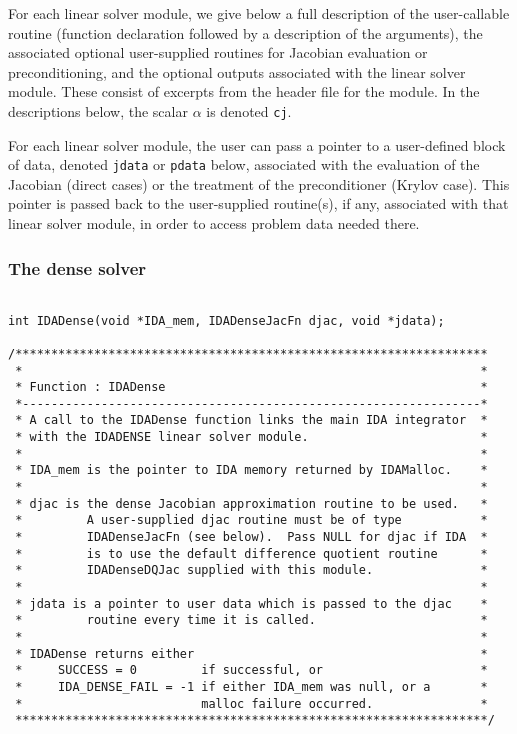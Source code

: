 For each linear solver module, we give below a full description of the
user-callable routine (function declaration followed by a description
of the arguments), the associated optional user-supplied routines for
Jacobian evaluation or preconditioning, and the optional outputs
associated with the linear solver module.  These consist of excerpts
from the header file for the module.  In the descriptions below, the
scalar $\alpha$ is denoted {\tt cj}.

For each linear solver module, the user can pass a pointer to a
user-defined block of data, denoted {\tt jdata} or {\tt pdata} below,
associated with the evaluation of the Jacobian (direct cases) or the
treatment of the preconditioner (Krylov case).  This pointer is passed
back to the user-supplied routine(s), if any, associated with that
linear solver module, in order to access problem data needed there.


\subsubsection{The dense solver}

\small
\begin{verbatim}

int IDADense(void *IDA_mem, IDADenseJacFn djac, void *jdata);
 
/******************************************************************
 *                                                                *
 * Function : IDADense                                            *
 *----------------------------------------------------------------*
 * A call to the IDADense function links the main IDA integrator  *
 * with the IDADENSE linear solver module.                        *
 *                                                                *
 * IDA_mem is the pointer to IDA memory returned by IDAMalloc.    *
 *                                                                *
 * djac is the dense Jacobian approximation routine to be used.   *
 *         A user-supplied djac routine must be of type           *
 *         IDADenseJacFn (see below).  Pass NULL for djac if IDA  *
 *         is to use the default difference quotient routine      *
 *         IDADenseDQJac supplied with this module.               *
 *                                                                *
 * jdata is a pointer to user data which is passed to the djac    *
 *         routine every time it is called.                       *
 *                                                                *
 * IDADense returns either                                        *
 *     SUCCESS = 0         if successful, or                      *
 *     IDA_DENSE_FAIL = -1 if either IDA_mem was null, or a       *
 *                         malloc failure occurred.               *
 ******************************************************************/

\end{verbatim}
\normalsize

